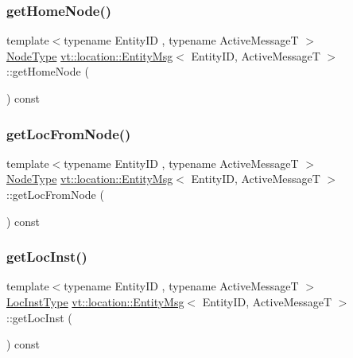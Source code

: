 \subsubsection{\texorpdfstring{get\+Home\+Node()}{getHomeNode()}}
{\footnotesize\ttfamily template$<$typename Entity\+ID , typename Active\+MessageT $>$ \\
\hyperlink{namespacevt_a866da9d0efc19c0a1ce79e9e492f47e2}{Node\+Type} \hyperlink{structvt_1_1location_1_1_entity_msg}{vt\+::location\+::\+Entity\+Msg}$<$ Entity\+ID, Active\+MessageT $>$\+::get\+Home\+Node (\begin{DoxyParamCaption}{ }\end{DoxyParamCaption}) const\hspace{0.3cm}{\ttfamily [inline]}}

\mbox{\label{structvt_1_1location_1_1_entity_msg_a38c36e0dd8a9207defaf44458a151d61}} 
\subsubsection{\texorpdfstring{get\+Loc\+From\+Node()}{getLocFromNode()}}
{\footnotesize\ttfamily template$<$typename Entity\+ID , typename Active\+MessageT $>$ \\
\hyperlink{namespacevt_a866da9d0efc19c0a1ce79e9e492f47e2}{Node\+Type} \hyperlink{structvt_1_1location_1_1_entity_msg}{vt\+::location\+::\+Entity\+Msg}$<$ Entity\+ID, Active\+MessageT $>$\+::get\+Loc\+From\+Node (\begin{DoxyParamCaption}{ }\end{DoxyParamCaption}) const\hspace{0.3cm}{\ttfamily [inline]}}

\mbox{\label{structvt_1_1location_1_1_entity_msg_a9393448a6cadfde96c2eab29d28b3e5b}} 
\subsubsection{\texorpdfstring{get\+Loc\+Inst()}{getLocInst()}}
{\footnotesize\ttfamily template$<$typename Entity\+ID , typename Active\+MessageT $>$ \\
\hyperlink{namespacevt_1_1location_a4db6456e8024af2d23fc5ae560fef866}{Loc\+Inst\+Type} \hyperlink{structvt_1_1location_1_1_entity_msg}{vt\+::location\+::\+Entity\+Msg}$<$ Entity\+ID, Active\+MessageT $>$\+::get\+Loc\+Inst (\begin{DoxyParamCaption}{ }\end{DoxyParamCaption}) const\hspace{0.3cm}{\ttfamily [inline]}}

